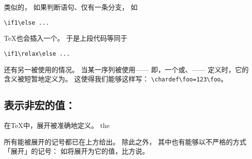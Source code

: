\documentclass{book}
\begin{document}
类似的，
如果判断语句、仅有一条分支，
如
\begin{verbatim}
\if1\else ...
\end{verbatim}
{\TeX}也会插入一个。
于是上段代码等同于
\begin{verbatim}
\if1\relax\else ...
\end{verbatim}

还有另一被使用的情况。
当某一序列被使用——
即，一个或、——
定义时，它的含义被短暂地定义为。
这使得我们能够这样写：
\verb>\chardef\foo=123\foo>。

\subsection{表示非宏的值：}

在{\TeX}中，展开被准确地定义。
\cstoidx the\par
所有能被展开的记号都已在上方给出。
除此之外，
其中也有能够以不严格的方式「展开」的记号：
如将展开为它的值，比方说\n{20pt}。
\end{document}
